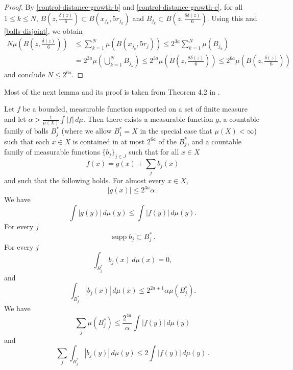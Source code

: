 \begin{proof}
By \eqref{control-distance-growth-b} and \eqref{control-distance-growth-c}, for all $1\le k \le N$, $B(z,\frac{\delta(z)}{6}) \subset B(x_{j_k}, 5r_{j_k})$ and $B_{j_k} \subset B(z,\frac{8\delta(z)}{6})$. Using this and \eqref{balls-disjoint}, we obtain
\begin{align}
    N \mu(B(z,\frac{\delta(z)}{6})) &\le \sum_{k=1}^N \mu(B(x_{j_k}, 5r_j)) \le 2^{3a} \sum_{k=1}^N \mu(B_{j_k}) \\
    &= 2^{3a} \mu(\bigcup_{k=1}^N B_{j_k}) \le 2^{3a} \mu(B(z,\frac{8\delta(z)}{6})) \le 2^{6a} \mu(B(z,\frac{\delta(z)}{6}))
\end{align}
and conclude $N\le 2^{6a}$.
\end{proof}

Most of the next lemma and its proof is taken from Theorem 4.2 in \cite{stein-book}.
\begin{lemma}
    \label{Calderon-Zygmund-decomposition}
    Let $f$ be a bounded, measurable function supported on a set of finite measure and let $\alpha>\frac{1}{\mu(X)}\int |f|\,d\mu$.
    Then there exists a measurable function $g$, a countable family of balls $B_j^*$ (where we allow $B_1^* = X$ in the special case that $\mu(X)<\infty$) such that each $x\in X$ is contained in at most $2^{6a}$ of the $B_j^*$, and a countable family of measurable functions $\{b_j\}_{j\in J}$ such that for all $x \in X$
    \begin{equation}
       \label{eq-gb-dec}
       f(x)= g(x) + \sum_{j} b_j(x)
    \end{equation}
    and such that the following holds. For almost every $x\in X$,
    \begin{equation}
        \label{eq-g-max}
       |g(x)|\leq 2^{3a} \alpha\,.
    \end{equation}
    We have
    \begin{equation}
        \label{eq-g-L1-norm}
        \int |g(y)|\, d\mu(y)\leq \int |f(y)|\, d\mu(y).
    \end{equation}
    For every $j$
    \begin{equation}
        \label{eq-supp-bj}
        \operatorname{supp} b_j \subset B_j^*\,.
    \end{equation}
    For every $j$
    \begin{equation}
        \label{eq-bad-mean-zero}
        \int_{B_j^*} b_j(x)\, d\mu(x)=0,
    \end{equation}
    and
     \begin{equation}
        \label{eq-bj-L1}
        \int_{B_j^*} |b_j(x)|\, d\mu(x) \leq 2^{2a+1} \alpha \mu(B_j^*).
    \end{equation}
    We have
    \begin{equation}
        \label{eq-bset-length-sum}
        \sum_j \mu(B_j^*)\leq \frac{2^{4a}}{\alpha}\int |f(y)|\, d\mu(y)
    \end{equation}
    and
    \begin{equation}
    \label{eq-b-L1}
    \sum_{j}\int_{B_j^*} |b_j(y)|\, d\mu(y)\leq 2 \int |f(y)|\, d\mu(y)\,.
    \end{equation}
\end{lemma}

